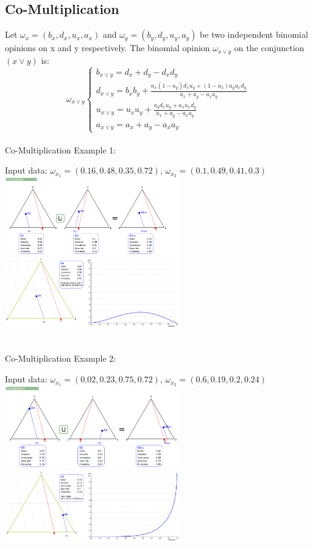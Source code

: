 \documentclass[UTF8]{article}
\newcommand{\opinion}[5]{$\omega_{#1} = (#2, #3, #4, #5)$}
\begin{document}
\subsection{Co-Multiplication}
Let \opinion{x}{b_x}{d_x}{u_x}{a_x} and \opinion{y}{b_y}{d_y}{u_y}{a_y} be two independent binomial opinions on x and y respectively. The binomial opinion $\omega_{x \lor y}$ on the conjunction $(x \lor y)$ is:
$$
\omega_{x \lor y}
\begin{cases}
    b_{x \lor y} = d_x + d_y - d_xd_y\\
    d_{x \lor y} = b_xb_y+ \frac{a_x(1 - a_y)d_xu_y + (1 - a_x)a_yu_xd_y}{a_x + a_y - a_xa_y}\\    
    u_{x \lor y} = u_xu_y+ \frac{a_yd_xu_y+a_xu_xd_y}{a_x+a_y-a_xa_y}\\
    a_{x \lor y} = a_x + a_y - a_xa_y
\end{cases}
$$\\
Co-Multiplication Example 1:\\
\begin{center}
    Input data:
    \opinion{x_1}{0.16}{0.48}{0.35}{0.72}, 
    \opinion{x_2}{0.1}{0.49}{0.41}{0.3}\\
    \includegraphics[width=3in]{images/comul1.png}
    \includegraphics[width=3in]{images/comul1viz.png}
\end{center}
\hrulefill\\
Co-Multiplication Example 2:
    \begin{center}
        Input data: 
        \opinion{x_1}{0.02}{0.23}{0.75}{0.72}, 
        \opinion{x_2}{0.6}{0.19}{0.2}{0.24}\\
        \includegraphics[width=3in]{images/comul2.png}
        \includegraphics[width=3in]{images/comul2viz.png}
    \end{center}
\end{document}
